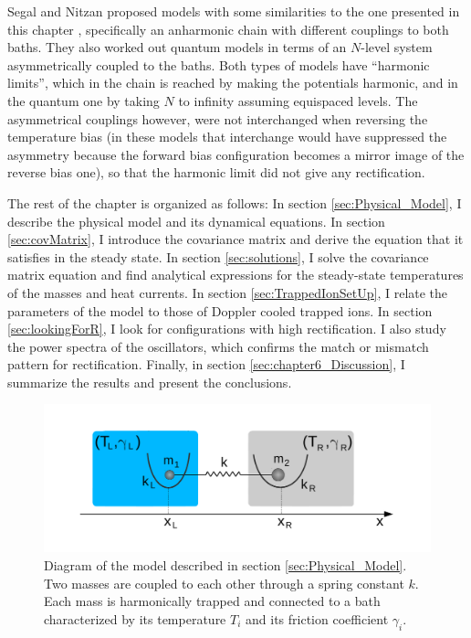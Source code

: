 Segal and Nitzan proposed models with some similarities to the one presented in this chapter \cite{Segal2005,Segal2005b}, specifically an anharmonic chain
with different couplings to both baths. They also worked out quantum models \cite{Segal2005,Segal2005b} in terms of an $N$-level
system asymmetrically coupled to the baths. Both types of models have ``harmonic limits'', which in the chain is reached by making the potentials
harmonic, and in the quantum one by taking $N$ to infinity assuming equispaced levels.
The asymmetrical couplings however, were not interchanged when reversing the temperature bias
(in these models that interchange would have suppressed the asymmetry because the forward bias configuration becomes a mirror image of the reverse bias one), so that
the harmonic limit did not give any rectification.

The rest of the chapter is organized as follows: In section \ref{sec:Physical_Model},
I describe the physical model and its dynamical equations. In section \ref{sec:covMatrix}, I introduce the covariance matrix and derive the equation that it satisfies in the steady state. In section \ref{sec:solutions}, I solve the covariance matrix equation and find analytical expressions for the steady-state temperatures of the masses and heat currents. In section \ref{sec:TrappedIonSetUp}, I relate the parameters of the model to those of Doppler cooled trapped ions. In section \ref{sec:lookingForR}, I look for configurations with high rectification. I also study the power spectra of the oscillators, which confirms the match or mismatch pattern for rectification. Finally, in section \ref{sec:chapter6_Discussion}, I summarize the results and present the conclusions.

\begin{figure}
  \center
  \includegraphics[width=0.75\linewidth]{Figures/model_diagram.pdf}
  \caption{Diagram of the model described in section \ref{sec:Physical_Model}. Two masses are coupled to each other through a spring constant $k$. Each mass is harmonically trapped and connected to a bath characterized by its temperature $T_i$ and its friction coefficient $\gamma_i$. }
  \label{fig:model_diagram}
\end{figure}
%
%
%
%

